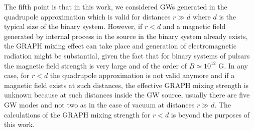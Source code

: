 \documentclass[a4paper,11pt]{article}
\begin{document}
The fifth point is that in this work, we considered GWs generated in the quadrupole approximation which is valid for distances $r\gg d$ where $d$ is the typical size of the binary system. However, if $r< d$ and a magnetic field generated by internal process in the source in the binary system already exists, the GRAPH mixing effect can take place and generation of electromagnetic radiation might be substantial, given the fact that for binary systems of pulsars the magnetic field strength is very large and of the order of $B\simeq 10^{12}$ G. In any case, for $r<d$ the quadrupole approximation is not valid anymore and if a magnetic field exists at such distances, the effective GRAPH mixing strength is unknown because at such distances inside the GW source, usually there are five GW modes and not two as in the case of vacuum at distances $r\gg d$. The calculations of the GRAPH mixing strength for $r<d$ is beyond the purposes of this work. 













\vspace{0.5cm}



 























 
 
 
 
 
 
 
 
 
 
 
 
\end{document}
